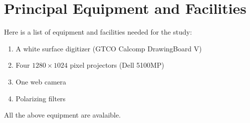 \section{Principal Equipment and Facilities}
Here is a list of equipment and facilities needed for the study:

\begin{enumerate}
	\item A white surface digitizer (GTCO Calcomp DrawingBoard V)
	\item Four $1280\times1024$ pixel projectors (Dell 5100MP)
	\item One web camera
	\item Polarizing filters
\end{enumerate}

All the above equipment are avalaible.

